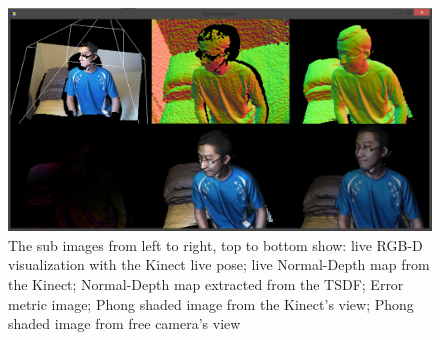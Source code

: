 \documentclass[12pt]{article}
\begin{document}
\begin{figure}[h!]
\includegraphics[width=\textwidth]{Bingzhe_Li_1.png}
\caption{\label{fig:result} The sub images from left to right, top to bottom show: live RGB-D visualization with the Kinect live pose; live Normal-Depth map from the Kinect; Normal-Depth map extracted from the TSDF; Error metric image; Phong shaded image from the Kinect's view; Phong shaded image from free camera's view }
\end{figure}



\end{document}
